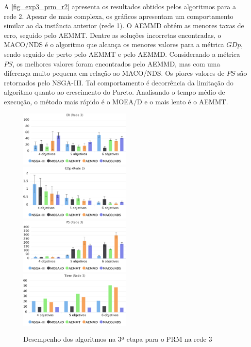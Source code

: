 A \autoref{fig_exp3_prm_r2} apresenta os resultados obtidos pelos algoritmos para a rede 2. Apesar de mais complexa, os gráficos apresentam um comportamento similar ao da instância anterior (rede 1). O AEMMD obtém as menores taxas de erro, seguido pelo AEMMT. Dentre as soluções incorretas encontradas, o MACO/NDS é o algoritmo que alcança os menores valores para a métrica $GDp$, sendo seguido de perto pelo AEMMT e pelo AEMMD. Considerando a métrica $PS$, os melhores valores foram encontrados pelo AEMMD, mas com uma diferença muito pequena em relação ao MACO/NDS. Os piores valores de $PS$ são retornados pelo NSGA-III. Tal comportamento é decorrência da limitação do algoritmo quanto ao crescimento do Pareto. Analisando o tempo médio de execução, o método mais rápido é o MOEA/D e o mais lento é o AEMMT.

\begin{figure}[!htbp]
	\includegraphics[width=0.5\textwidth]{cap_experimentos/figs/etapa3/er-mrp-r3}
	\includegraphics[width=0.5\textwidth]{cap_experimentos/figs/etapa3/gd-mrp-r3}
	\includegraphics[width=0.5\textwidth]{cap_experimentos/figs/etapa3/ps-mrp-r3}
	\includegraphics[width=0.5\textwidth]{cap_experimentos/figs/etapa3/time-mrp-r3}
	\caption{\label{fig_exp3_prm_r3}Desempenho dos algoritmos na 3ª etapa para o PRM na rede 3}
\end{figure}

